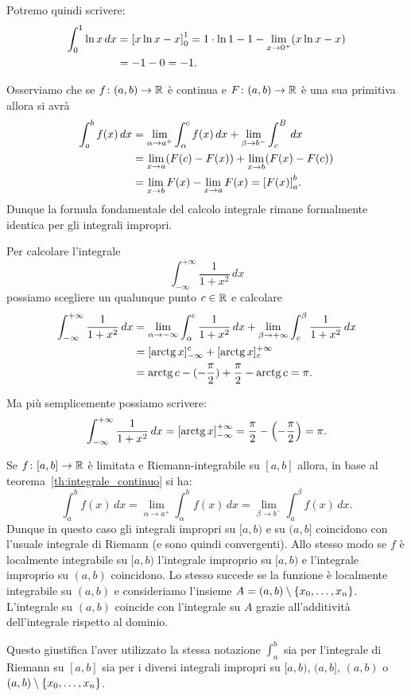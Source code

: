Potremo quindi scrivere:
\begin{align*}
  \int_0^1 \ln x\, dx
  &= {\left[ x\ln x- x \right]}_0^1
  = 1 \cdot\ln 1 -1 - \lim_{x\to 0^+} (x\ln x - x) \\
  &= -1  - 0 = -1.
\end{align*}

Osserviamo che se $f\colon(a,b) \to \mathbb R$ è continua e $F\colon(a,b)\to \mathbb R$
è una sua primitiva
allora si avrà
\begin{align*}
  \int_a^b f(x)\, dx
   &= \lim_{\alpha\to a^+}\int_{\alpha}^c f(x)\, dx
   + \lim_{\beta\to b^-}\int_c^{B}\, dx \\
   & = \lim_{x\to a} (F(c)-F(x)) + \lim_{x\to b} (F(x)-F(c)) \\
   & = \lim_{x\to b} F(x) - \lim_{x\to a} F(x)
   = {\left[ F(x) \right]}_a^b.
\end{align*}
Dunque la formula fondamentale del calcolo integrale rimane formalmente identica
per gli integrali impropri.

\begin{example}
Per calcolare l'integrale
\[
  \int_{-\infty}^{+\infty} \frac{1}{1+x^2}\, dx
\]
possiamo scegliere un qualunque punto $c\in \mathbb R$ e calcolare
\begin{align*}
\int_{-\infty}^{+\infty}\frac{1}{1+x^2}\, dx
&=
\lim_{\alpha\to-\infty}\int_\alpha^c \frac{1}{1+x^2}\, dx
  + \lim_{\beta\to+\infty}\int_c^\beta \frac{1}{1+x^2}\, dx\\
  &= [\operatorname{arctg} x]_{-\infty}^c
  + [\operatorname{arctg} x]_c^{+\infty}  \\
  &= \operatorname{arctg} c - (-\frac\pi 2) + \frac \pi 2 - \operatorname{arctg} c
  = \pi.
\end{align*}

Ma più semplicemente possiamo scrivere:
\[
 \int_{-\infty}^{+\infty}\frac{1}{1+x^2}\, dx
 = {\left[ \operatorname{arctg} x \right]}_{-\infty}^{+\infty}
 = \frac \pi 2 - {\left( -\frac \pi 2 \right)} = \pi.
 \]

\end{example}

\begin{remark}
Se $f\colon[a,b]\to\mathbb R$ è limitata e Riemann-integrabile su
$[a,b]$ allora,
in base al teorema~\ref{th:integrale_continuo}
si ha:
\[
 \int_a^b f(x)\, dx
  = \lim_{\alpha \to a^+} \int_\alpha^b f(x)\, dx
  = \lim_{\beta\to b^-}\int_a^\beta f(x)\,dx.
\]
Dunque in questo caso gli integrali impropri su $[a,b)$ e su $(a,b]$ coincidono
con l'usuale integrale di Riemann (e sono quindi convergenti).
Allo stesso modo se $f$ è localmente integrabile su $[a,b)$
l'integrale improprio su $[a,b)$ e l'integrale improprio su
$(a,b)$ coincidono.
Lo stesso succede se la funzione è localmente integrabile
su $(a,b)$ e consideriamo l'insieme $A=(a,b)\setminus{\left\{ x_0,\dots,x_n \right\}}$.
L'integrale su $(a,b)$ coincide con l'integrale su $A$ grazie all'additività
dell'integrale rispetto al dominio.

Questo giustifica l'aver utilizzato la stessa notazione $\int_a^b$ sia per l'integrale
di Riemann su $[a,b]$ sia per i diversi integrali impropri su $[a,b)$, $(a,b]$,
$(a,b)$ o $(a,b)\setminus{\left\{ x_0, \dots, x_n \right\}}$.
\end{remark}

